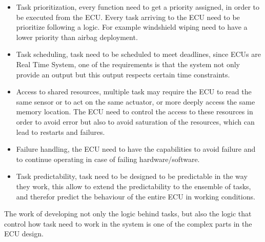 \documentclass[../main.tex]{subfiles}
\begin{document}
\begin{itemize}
    \item Task prioritization, every function need to get a priority assigned, in order to be executed from the ECU. Every task arriving to the ECU need to be prioritize following a logic. For example windshield wiping need to have a lower priority than airbag deployment. 
    \item Task scheduling, task need to be scheduled to meet deadlines, since ECUs are Real Time System, one of the requirements is that the system not only provide an output but this output respects certain time constraints.
    \item Access to shared resources, multiple task may require the ECU to read the same sensor or to act on the same actuator, or more deeply access the same memory location. The ECU need to control the access to these resources in order to avoid error but also to avoid saturation of the resources, which can lead to restarts and failures.  
    \item Failure handling, the ECU need to have the capabilities to avoid failure and to continue operating in case of failing hardware/software.
    \item Task predictability, task need to be designed to be predictable in the way they work, this allow to extend the predictability to the ensemble of tasks, and therefor predict the behaviour of the entire ECU in working conditions. 
\end{itemize}
The work of developing not only the logic behind tasks, but also the logic that control how task need to work in the system is one of the complex parts in the ECU design. 
\end{document}
